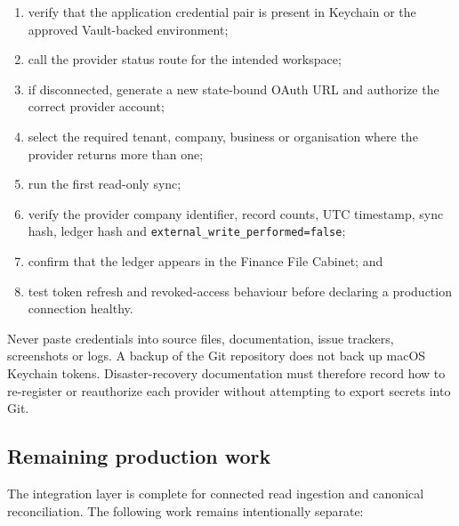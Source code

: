 \begin{enumerate}[leftmargin=*]
  \item verify that the application credential pair is present in Keychain or
        the approved Vault-backed environment;
  \item call the provider status route for the intended workspace;
  \item if disconnected, generate a new state-bound OAuth URL and authorize the
        correct provider account;
  \item select the required tenant, company, business or organisation where the
        provider returns more than one;
  \item run the first read-only sync;
  \item verify the provider company identifier, record counts, UTC timestamp,
        sync hash, ledger hash and \texttt{external\_write\_performed=false};
  \item confirm that the ledger appears in the Finance File Cabinet; and
  \item test token refresh and revoked-access behaviour before declaring a
        production connection healthy.
\end{enumerate}

Never paste credentials into source files, documentation, issue trackers,
screenshots or logs.  A backup of the Git repository does not back up macOS
Keychain tokens.  Disaster-recovery documentation must therefore record how to
re-register or reauthorize each provider without attempting to export secrets
into Git.

\subsection{Remaining production work}

The integration layer is complete for connected read ingestion and canonical
reconciliation.  The following work remains intentionally separate:

